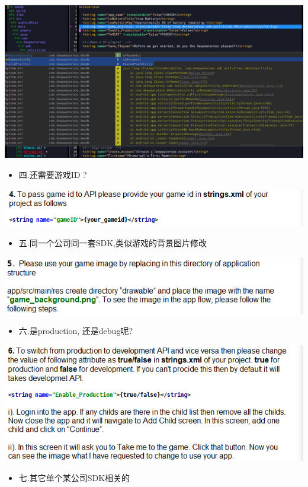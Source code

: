\documentclass[9pt, b5paper]{article}
\begin{document}
\includegraphics[width=.9\linewidth]{./pic/notes_20221226_151633.png}
　
\begin{itemize}
\item 四.还需要游戏ID ?
\end{itemize}

\includegraphics[width=.9\linewidth]{./pic/notes_20221220_153240.png}
\begin{itemize}
\item 五.同一个公司同一套SDK,类似游戏的背景图片修改
\end{itemize}

\includegraphics[width=.9\linewidth]{./pic/notes_20221220_153320.png}
\begin{itemize}
\item 六.是production, 还是debug呢?
\end{itemize}

\includegraphics[width=.9\linewidth]{./pic/notes_20221220_153405.png}
\begin{itemize}
\item 七.其它单个某公司SDK相关的
\end{itemize}
\end{document}
